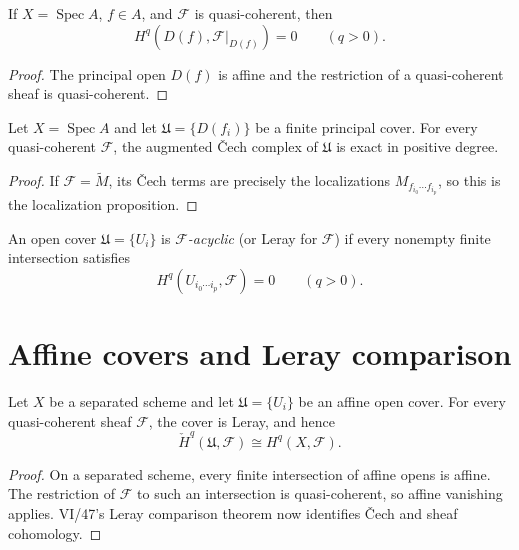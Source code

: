 \begin{corollary}\label{cor:vi49-basic-open}
If $X=\operatorname{Spec}A$, $f\in A$, and $\mathcal F$ is quasi-coherent, then
\[
H^q(D(f),\mathcal F|_{D(f)})=0\qquad(q>0).
\]
\begin{proof}
The principal open $D(f)$ is affine and the restriction of a quasi-coherent sheaf is quasi-coherent.
\end{proof}
\end{corollary}

\begin{proposition}\label{prop:vi49-affine-cech}
Let $X=\operatorname{Spec}A$ and let $\mathfrak U=\{D(f_i)\}$ be a finite principal cover. For every quasi-coherent $\mathcal F$, the augmented Čech complex of $\mathfrak U$ is exact in positive degree.
\begin{proof}
If $\mathcal F=\widetilde M$, its Čech terms are precisely the localizations $M_{f_{i_0}\cdots f_{i_p}}$, so this is the localization proposition.
\end{proof}
\end{proposition}

\begin{definition}\label{def:vi49-leray}
An open cover $\mathfrak U=\{U_i\}$ is \emph{$\mathcal F$-acyclic} (or Leray for $\mathcal F$) if every nonempty finite intersection satisfies
\[
H^q(U_{i_0\cdots i_p},\mathcal F)=0\qquad(q>0).
\]
\end{definition}

\section{Affine covers and Leray comparison}
\begin{theorem}\label{thm:vi49-affine-leray}
Let $X$ be a separated scheme and let $\mathfrak U=\{U_i\}$ be an affine open cover. For every quasi-coherent sheaf $\mathcal F$, the cover is Leray, and hence
\[
\check H^q(\mathfrak U,\mathcal F)\cong H^q(X,\mathcal F).
\]
\begin{proof}
On a separated scheme, every finite intersection of affine opens is affine. The restriction of $\mathcal F$ to such an intersection is quasi-coherent, so affine vanishing applies. VI/47's Leray comparison theorem now identifies Čech and sheaf cohomology.
\end{proof}
\end{theorem}

